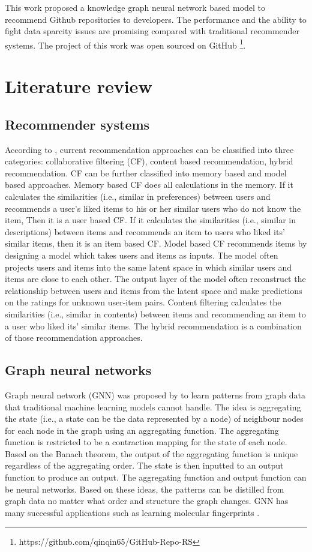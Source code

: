 \documentclass[11pt,twoside]{report}
\begin{document}
This work proposed a knowledge graph neural network based model to recommend Github repositories to developers. The performance and the ability to fight data sparcity issues are promising compared with traditional recommender systems. The project of this work was open sourced on GitHub \footnote{https://github.com/qinqin65/GitHub-Repo-RS}.

\chapter{Literature review}
\section{Recommender systems}
According to \cite{mansur_review_nodate, park_literature_2012}, current recommendation approaches can be classified into three categories: collaborative filtering (CF), content based recommendation, hybrid recommendation. CF can be further classified into memory based and model based approaches. Memory based CF does all calculations in the memory. If it calculates the similarities (i.e., similar in preferences) between users and recommends a user's liked items to his or her similar users who do not know the item, Then it is a user based CF. If it calculates the similarities (i.e., similar in descriptions) between items and recommends an item to users who liked its' similar items, then it is an item based CF. Model based CF recommends items by designing a model which takes users and items as inputs. The model often projects users and items into the same latent space in which similar users and items are close to each other. The output layer of the model often reconstruct the relationship between users and items from the latent space and make predictions on the ratings for unknown user-item pairs. Content filtering calculates the similarities (i.e., similar in contents) between items and recommending an item to a user who liked its' similar items. The hybrid recommendation is a combination of those recommendation approaches.

\section{Graph neural networks}
Graph neural network (GNN) was proposed by \cite{gori_new_2005, scarselli_graph_2009} to learn patterns from graph data that traditional machine learning models cannot handle. The idea is aggregating the state (i.e., a state can be the data represented by a node) of neighbour nodes for each node in the graph using an aggregating function. The aggregating function is restricted to be a contraction mapping for the state of each node. Based on the Banach theorem, the output of the aggregating function is unique regardless of the aggregating order. The state is then inputted to an output function to produce an output. The aggregating function and output function can be neural networks. Based on these ideas, the patterns can be distilled from graph data no matter what order and structure the graph changes. GNN has many successful applications such as learning molecular fingerprints \cite{duvenaud_convolutional_2015}.
\end{document}
